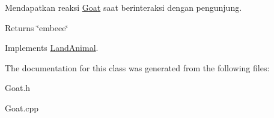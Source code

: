 Mendapatkan reaksi \hyperlink{classGoat}{Goat} saat berinteraksi dengan pengunjung. 

\begin{DoxyReturn}{Returns}
\char`\"{}embeee\char`\"{} 
\end{DoxyReturn}


Implements \hyperlink{classLandAnimal}{Land\-Animal}.



The documentation for this class was generated from the following files\-:\begin{DoxyCompactItemize}
\item 
Goat.\-h\item 
Goat.\-cpp\end{DoxyCompactItemize}
